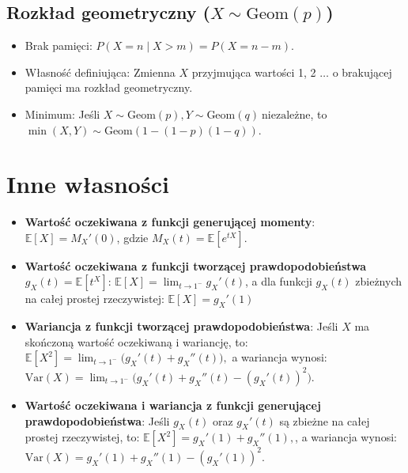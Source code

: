 \documentclass{article}
\theoremstyle{definition}
\theoremstyle{remark}
\begin{document}
\begin{multicols}{2}
    \subsection*{Rozkład geometryczny (\( X \sim \text{Geom}(p) \))}
    \begin{itemize}[itemsep=0pt, left=0pt]
        \item Brak pamięci: \( P(X=n \mid X>m) = P(X=n-m) \).
        \item Własność definiująca: Zmienna \( X \) przyjmująca wartości 1, 2 \(\ldots\)  o brakującej pamięci ma rozkład geometryczny.
        \item Minimum: Jeśli \( X \sim \text{Geom}(p), Y \sim \text{Geom}(q) \ \text{niezależne} \), to \( \min(X, Y) \sim \text{Geom}(1-(1-p)(1-q)) \).
    \end{itemize}
    
    \section*{Inne własności}
    \begin{itemize}
    
    \item \textbf{Wartość oczekiwana z funkcji generującej momenty}: \(\mathbb{E}[X] = M_X'(0)\), gdzie \( M_X(t) = \mathbb{E}[e^{tX}] \).
    
    \item \textbf{Wartość oczekiwana z funkcji tworzącej prawdopodobieństwa} \( g_X(t) = \mathbb{E}[t^X] \): \(\mathbb{E}[X] = \lim_{t \to 1^-} g_X'(t)\), 
    a dla funkcji \( g_X(t) \) zbieżnych na całej prostej rzeczywistej: \(\mathbb{E}[X] = g_X'(1)\)
    
    \item \textbf{Wariancja z funkcji tworzącej prawdopodobieństwa}: 
    Jeśli \( X \) ma skończoną wartość oczekiwaną i wariancję, to:
    \(
    \mathbb{E}[X^2] = \lim_{t \to 1^-} \big(g_X'(t) + g_X''(t)\big),
    \)
    a wariancja wynosi:
    \(
    \mathrm{Var}(X) = \lim_{t \to 1^-} \big(g_X'(t) + g_X''(t) - (g_X'(t))^2\big).
    \)
    
    \item \textbf{Wartość oczekiwana i wariancja z funkcji generującej prawdopodobieństwa}: 
    Jeśli \( g_X(t) \) oraz \( g_X'(t) \) są zbieżne na całej prostej rzeczywistej, to:
    \(
    \mathbb{E}[X^2] = g_X'(1) + g_X''(1),
    \), a wariancja wynosi:
    \(
    \text{Var}(X) = g_X'(1) + g_X''(1) - (g_X'(1))^2.
    \)
    
    \end{itemize}




\end{multicols}
\end{document}
